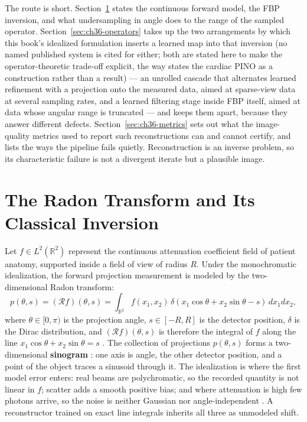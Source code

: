 The route is short. Section~\ref{sec:ch36-radon} states the continuous forward
model, the FBP inversion, and what undersampling in angle does to the range of
the sampled operator. Section~\ref{sec:ch36-operators} takes up the two
arrangements by which this book's idealized formulation inserts a learned map into that
inversion (no named published system is cited for either; both are stated here to make
the operator-theoretic trade-off explicit, the way 
states the cardiac PINO as a construction rather than a result) --- an
unrolled cascade that alternates learned refinement with a projection onto the
measured data, aimed at sparse-view data at several sampling rates, and a learned
filtering stage inside FBP itself, aimed at data whose angular range is
truncated --- and keeps them apart, because they answer different defects.
Section~\ref{sec:ch36-metrics} sets out what the image-quality metrics used to
report such reconstructions can and cannot certify, and lists the ways the
pipeline fails quietly. Reconstruction is an inverse problem, so its
characteristic failure is not a divergent iterate but a plausible
image.

\section{The Radon Transform and Its Classical Inversion}
\label{sec:ch36-radon}

Let $f \in L^2(\mathbb{R}^2)$ represent the continuous attenuation coefficient
field of patient anatomy, supported inside a field of view of radius $R$. Under
the monochromatic idealization, the forward projection measurement is modeled by
the two-dimensional Radon transform:
\begin{equation}
  \label{eq:ch36-radon}
  p(\theta, s) = (\mathcal{R} f)(\theta, s) = \int_{\mathbb{R}^2} f(x_1, x_2) \, \delta(x_1 \cos\theta + x_2 \sin\theta - s) \, dx_1 dx_2,
\end{equation}
where $\theta \in [0, \pi)$ is the projection angle, $s \in [-R, R]$ is the
detector position, $\delta$ is the Dirac distribution, and
$(\mathcal{R}f)(\theta,s)$ is therefore the integral of $f$ along the line
$x_1\cos\theta + x_2\sin\theta = s$ . The collection of
projections $p(\theta, s)$ forms a two-dimensional \textbf{sinogram}
: one axis is angle, the other detector position, and a point of
the object traces a sinusoid through it. The idealization is where the first
model error enters: real beams are polychromatic, so the recorded quantity is
not linear in $f$; scatter adds a smooth positive bias; and where attenuation is
high few photons arrive, so the noise is neither Gaussian nor angle-independent
. A reconstructor trained on exact line integrals inherits
all three as unmodeled shift.

